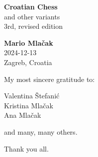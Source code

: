 \documentclass[a5paper,12pt]{book} %
\begin{document}
\thispagestyle{empty}
\vspace*{7.3\baselineskip}
\begin{center}
    \textbf{\Large{Croatian Chess}} \\ [1.0em]
    \large{and other variants} \\ [1.0em]
    \small{3rd, revised edition} \\ [2.0cm]
    \vspace*{7.3\baselineskip}

    \textbf{\large{Mario Mlačak}} \\ [1.0em]
    \small{2024-12-13} \\ [0.5em] %
    \small{Zagreb, Croatia}
\end{center}
\clearpage %

\thispagestyle{empty}
\vspace*{0.1\textheight}
\clearpage %

\thispagestyle{empty}
\vspace*{0.2\textheight}
\begin{flushright}
My most sincere gratitude to:

Valentina Štefanić \\
Kristina Mlačak \\
Ana Mlačak

and many, many others.

Thank you all.
\end{flushright}
\clearpage %

\thispagestyle{empty}
\vspace*{0.1\textheight}
\clearpage %


\end{document}
